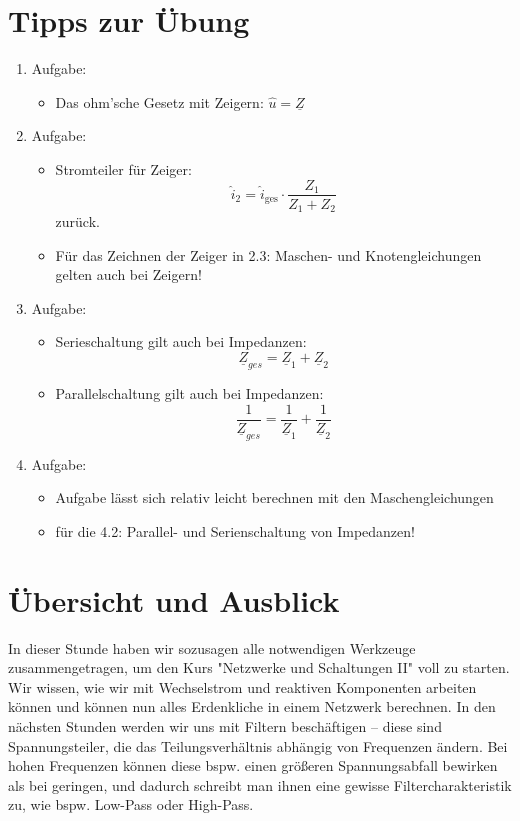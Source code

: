 \documentclass[11pt,a4paper]{article}
\begin{document}
\section{Tipps zur Übung}






\begin{enumerate}
    \item Aufgabe: 
    \begin{itemize}
        \item Das ohm'sche Gesetz mit Zeigern: $\hat{u} = \underline{Z}$ 
    \end{itemize}
    \item Aufgabe:
    \begin{itemize}
        \item Stromteiler für Zeiger:
        \[
        \hat{i}_2 = \hat{i}_\text{ges} \cdot \frac{Z_1}{Z_1 + Z_2}
        \]
        zurück.
        \item Für das Zeichnen der Zeiger in 2.3: Maschen- und Knotengleichungen gelten auch bei Zeigern!
    \end{itemize}

    \item Aufgabe: 
    \begin{itemize}
        \item Serieschaltung gilt auch bei Impedanzen:
        \[
        \underline{Z}_{ges} = \underline{Z}_{1} + \underline{Z}_{2}
        \]
        \item Parallelschaltung gilt auch bei Impedanzen:
        \[
        \frac{1}{\underline{Z}_{ges}} = \frac{1}{\underline{Z}_{1}} + \frac{1}{\underline{Z}_{2}}
        \]
    \end{itemize}

    \item Aufgabe: 
    \begin{itemize}
        \item Aufgabe lässt sich relativ leicht berechnen mit den Maschengleichungen
        \item für die 4.2: Parallel- und Serienschaltung von Impedanzen!
    \end{itemize}
\end{enumerate}

\vspace{1cm}

\section{Übersicht und Ausblick}

In dieser Stunde haben wir sozusagen alle notwendigen Werkzeuge zusammengetragen, um den Kurs "Netzwerke und Schaltungen II" voll zu starten. Wir wissen, wie wir mit Wechselstrom und reaktiven Komponenten arbeiten können und können nun alles Erdenkliche in einem Netzwerk berechnen. In den nächsten Stunden werden wir uns mit Filtern beschäftigen – diese sind Spannungsteiler, die das Teilungsverhältnis abhängig von Frequenzen ändern. Bei hohen Frequenzen können diese bspw. einen größeren Spannungsabfall bewirken als bei geringen, und dadurch schreibt man ihnen eine gewisse Filtercharakteristik zu, wie bspw. Low-Pass oder High-Pass.
\end{document}
